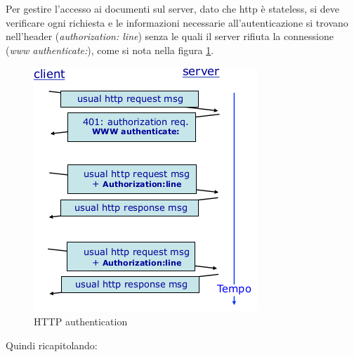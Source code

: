 \message{ !name(sd.tex)}\documentclass[a4paper,12pt, oneside]{book}
\begin{document}
Per gestire l'accesso ai documenti sul server, dato che http è stateless, si deve verificare ogni richiesta 
e le informazioni necessarie all'autenticazione si trovano nell'header (\textit{authorization: line}) 
senza le quali il server rifiuta la connessione (\textit{www authenticate:}), come si nota 
nella figura \ref{img:authentication}.
\begin{figure}
    \caption{HTTP authentication}
    \label{img:authentication}
	\includegraphics[scale=0.7]{img/http6.png}
\end{figure}
Quindi ricapitolando:
\end{document}
